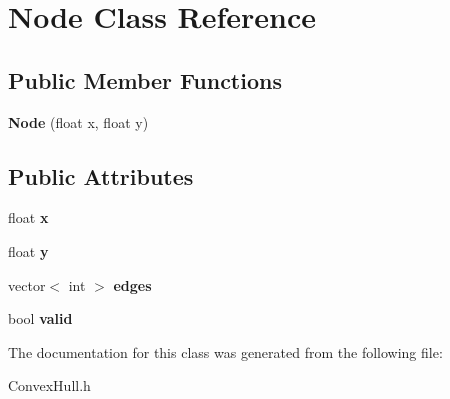 \hypertarget{classNode}{}\section{Node Class Reference}
\label{classNode}
\subsection*{Public Member Functions}
\begin{DoxyCompactItemize}
\item 
\mbox{\label{classNode_a1138eb11736340db5f32822e06713ac7}} 
{\bfseries Node} (float x, float y)
\end{DoxyCompactItemize}
\subsection*{Public Attributes}
\begin{DoxyCompactItemize}
\item 
\mbox{\label{classNode_a3a6b88b82c51d21305656d01e3c53039}} 
float {\bfseries x}
\item 
\mbox{\label{classNode_a0658e9aa67d95daa5da3cca23b13f6de}} 
float {\bfseries y}
\item 
\mbox{\label{classNode_abcb500d3da676ec5e7baa79d1b0d82ec}} 
vector$<$ int $>$ {\bfseries edges}
\item 
\mbox{\label{classNode_a95675277741c2e027fa3108db33ae874}} 
bool {\bfseries valid}
\end{DoxyCompactItemize}


The documentation for this class was generated from the following file\+:\begin{DoxyCompactItemize}
\item 
Convex\+Hull.\+h\end{DoxyCompactItemize}
